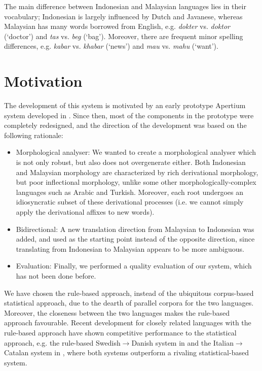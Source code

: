 \documentclass[10pt,a5paper,twoside]{article}
\begin{document}
The main difference between Indonesian and Malaysian languages lies in their vocabulary; Indonesian is largely influenced by Dutch and Javanese, whereas Malaysian has many words borrowed from English, e.g. \emph{dokter} vs. \emph{doktor} (`doctor') and \emph{tas} vs. \emph{beg} (`bag'). Moreover, there are frequent minor spelling differences, e.g. \emph{kabar} vs. \emph{khabar} (`news') and \emph{mau} vs. \emph{mahu} (`want').

\section{Motivation}
\label{sec:prev}
The development of this system is motivated by an early prototype Apertium system developed in \citet{larasati2010study}. Since then, most of the components in the prototype were completely redesigned, and the direction of the development was based on the following rationale:
\begin{itemize}
\item{Morphological analyser: We wanted to create a morphological analyser which is not only robust, but also does not overgenerate either. Both Indonesian and Malaysian morphology are characterized by rich derivational morphology, but poor inflectional morphology, unlike some other morphologically-complex languages such as Arabic and Turkish. Moreover, each root undergoes an idiosyncratic subset of these derivational processes (i.e. we cannot simply apply the derivational affixes to new words).}
\item{Bidirectional: A new translation direction from Malaysian to Indonesian was added, and used as the starting point instead of the opposite direction, since translating from Indonesian to Malaysian appears to be more ambiguous.}
\item{Evaluation: Finally, we performed a quality evaluation of our system, which has not been done before.}
\end{itemize}

We have chosen the rule-based approach, instead of the ubiquitous corpus-based statistical approach, due to the dearth of parallel corpora for the two languages. Moreover, the closeness between the two languages makes the rule-based approach favourable. Recent development for closely related languages with the rule-based approach have shown competitive performance to the statistical approach, e.g. the rule-based Swedish$\rightarrow$Danish system in \citet{tyers2009svda} and the Italian$\rightarrow$Catalan system in \citet{tyers2011itca}, where both systems outperform a rivaling statistical-based system.
\end{document}
